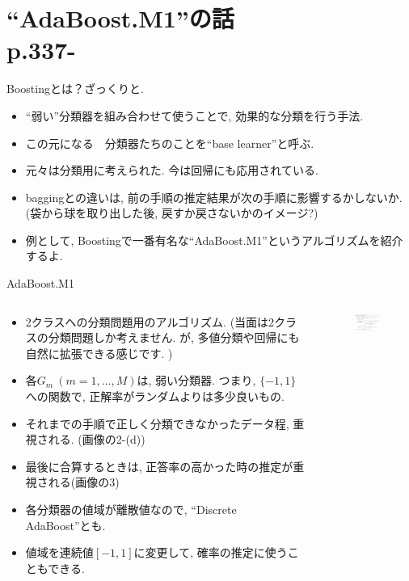 \documentclass[dvipdfmx,8pt]{beamer}
\begin{document}
  \section{``AdaBoost.M1''の話\\p.337-}
  \begin{frame}{Boostingとは？ざっくりと. }
    \begin{itemize}
      \item ``弱い''分類器を組み合わせて使うことで, 効果的な分類を行う手法.
      \item この元になる　分類器たちのことを``base learner''と呼ぶ.
      \item 元々は分類用に考えられた. 今は回帰にも応用されている.
      \item baggingとの違いは, 前の手順の推定結果が次の手順に影響するかしないか. (袋から球を取り出した後, 戻すか戻さないかのイメージ?)
      \item 例として, Boostingで一番有名な``AdaBoost.M1''というアルゴリズムを紹介するよ.
    \end{itemize}
  \end{frame}
  \begin{frame}{AdaBoost.M1}
    \begin{columns}[t]
      \begin{column}{0.5\linewidth}
        \begin{itemize}
          \item 2クラスへの分類問題用のアルゴリズム. (当面は2クラスの分類問題しか考えません. が, 多値分類や回帰にも自然に拡張できる感じです. )
          \item 各$G_m \ (m=1,\dots,M)$は, 弱い分類器. つまり, $\{-1,1\}$への関数で, 正解率がランダムよりは多少良いもの.
          \item それまでの手順で正しく分類できなかったデータ程, 重視される. (画像の2-(d))
          \item 最後に合算するときは, 正答率の高かった時の推定が重視される(画像の3)
          \item 各分類器の値域が離散値なので, ``Discrete AdaBoost''とも.
          \item 値域を連続値$[-1,1]$に変更して, 確率の推定に使うこともできる.
        \end{itemize}
      \end{column}
      \begin{column}{0.5\linewidth}
        \begin{figure}[htb]
          \centering
          \includegraphics[width=5cm,clip]{images/AdaBoost.png}
        \end{figure}
      \end{column}
    \end{columns}
  \end{frame}
\end{document}
